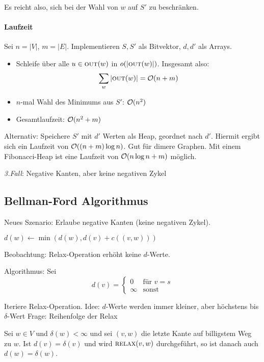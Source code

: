             Es reicht also, sich bei der Wahl von $w$ auf $S'$ zu beschränken.

            \paragraph{Laufzeit}
            Sei $n = |V|$, $m = |E|$. Implementieren $S, S'$ als Bitvektor, $d, d'$ als Arrays.
            \begin{itemize}
                \item Schleife über alle $u \in \textsc{out}(w)$ in $o(|\textsc{out}(w)|)$. Insgesamt also:
                    $$
                    \sum_{w} |\textsc{out}(w)| = \mathcal{O}(n + m)
                    $$
                \item $n$-mal Wahl des Minimums aus $S'$: $\mathcal{O}(n^2)$
                \item Gesamtlaufzeit: $\mathcal{O}(n^2 + m)$
            \end{itemize}

            Alternativ: Speichere $S'$ mit $d'$ Werten als Heap, geordnet nach $d'$. Hiermit ergibt sich ein Laufzeit von $\mathcal{O}((n + m) \log n)$. Gut für dimere Graphen. Mit einem Fibonacci-Heap ist eine Laufzeit von $\mathcal{O}(n \log n + m)$ möglich.

        \emph{3.Fall}: Negative Kanten, aber keine negativen Zykel\\
        \subsection{Bellman-Ford Algorithmus}
        Neues Szenario: Erlaube negative Kanten (keine negativen Zykel).
        \begin{algorithmic}
                \State $d(w) \gets \min(d(w), d(v) + c((v, w)))$
            \EndFunction
        \end{algorithmic}

        Beobachtung: Relax-Operation erhöht keine $d$-Werte.

        Algorithmus:
        Sei 
        $$
        d(v) = \begin{cases} 0 & \text{für } v = s \\ \infty & \text{sonst} \end{cases}
        $$

        Iteriere Relax-Operation.
        Idee: $d$-Werte werden immer kleiner, aber höchstens bis $\delta$-Wert
        Frage: Reihenfolge der Relax
        \begin{lemma}
            Sei $w \in V$ und $\delta(w) < \infty$ und sei $(v, w)$ die letzte Kante
            auf billigstem Weg zu $w$. Ist $d(v) = \delta(v)$ und wird $\textsc{relax}(v,w)$
            durchgeführt, so ist danach auch $d(w) = \delta(w)$.
        \end{lemma}


